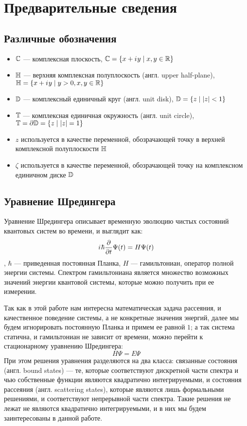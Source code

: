 \chapter{Предварительные сведения}

\section{Различные обозначения}
\begin{itemize}
\item $\mathbb{C}$ — комплексная плоскость, $\mathbb{C} = \{ x + {i\mkern1mu} y \mid x, y \in \mathbb{R} \}$ 
\item $\mathbb{H}$ — верхняя комплексная полуплоскость (англ. upper half-plane), $\mathbb{H} = \{ x + {i\mkern1mu} y \mid y > 0, x, y \in \mathbb{R} \}$
\item $\mathbb{D}$ — комплексный единичный круг (англ. unit disk), $\mathbb{D} = \{ z \mid \abs{z} < 1 \}$
\item $\mathbb{T}$ — комплексная единичная окружность (англ. unit circle), $\mathbb{T} = \partial \mathbb{D} =  \{z \mid \abs{z} = 1 \}$
\item $z$ используется в качестве переменной, обозрачающей точку в верхней комплексной полуплоскости $\mathbb{H}$
\item $\zeta$ используется в качестве переменной, обозрачающей точку на комплексном единичном диске $\mathbb{D}$
\end{itemize}

\section{Уравнение Шредингера}

Уравнение Шредингера описывает временную эволюцию чистых состояний квантовых систем во времени, и выглядит как:
\[
{i\mkern1mu} \hbar \pdv{t} \Psi(t) = H \Psi(t)
\]
, $\hbar$ — приведенная постоянная Планка, $H$ — гамильтониан, оператор полной энергии системы. Спектром гамильтониана является множество возможных значений энергии квантовой системы, которые можно получить при ее измерении.

Так как в этой работе нам интересна математическая задача рассеяния, и качественное поведение системы, а не конкретные значения энергий, далее мы будем игнорировать постоянную Планка и примем ее равной $1$; а так система статична, и гамильтониан не зависит от времени, можно перейти к стационарному уравнению Шредингера:
\[
H \Psi = E \Psi
\]
При этом решения уравнения разделяются на два класса: связанные состояния (англ. bound states) — те, которые соответствуют дискретной части спектра и чью собственные функции являются квадратично интегрируемыми, и состояния рассеяния (англ. scattering states), которые являются лишь формальными решениями, и соответствуют непрерывной части спектра. Такие решения не лежат не являются квадратично интегрируемыми, и в них мы будем заинтересованы в данной работе.

